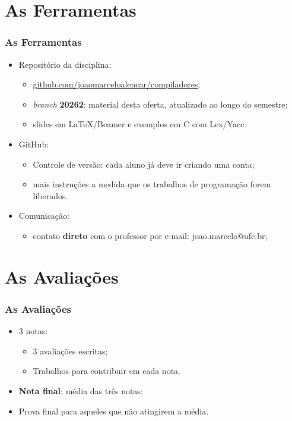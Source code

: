 \documentclass[table]{beamer}
\begin{document}
\section{As Ferramentas}
\begin{frame}
   \frametitle{As Ferramentas}
   \begin{itemize}
      \item Repositório da disciplina:
      \begin{itemize}
         \item \url{github.com/joaomarceloalencar/compiladores};
	 \item \textit{branch} \textbf{20262}: material desta oferta, atualizado ao longo do semestre;
	 \item slides em \LaTeX/Beamer e exemplos em C com Lex/Yacc.
      \end{itemize}
      \item GitHub:
      \begin{itemize}
         \item Controle de versão: cada aluno já deve ir criando uma conta;
	 \item mais instruções a medida que os trabalhos de programação forem liberados.
      \end{itemize}
      \item Comunicação:
      \begin{itemize}
         \item contato \textbf{direto} com o professor por e-mail: joao.marcelo@ufc.br;
      \end{itemize}
   \end{itemize}
\end{frame}

\section{As Avaliações}
\begin{frame}
   \frametitle{As Avaliações}
   \begin{itemize}
      \item 3 notas:
      \begin{itemize}
         \item 3 avaliações escritas;
	      \item Trabalhos para contribuir em cada nota.
      \end{itemize}
      \item \textbf{Nota final}: média das três notas;
      \item Prova final para aqueles que não atingirem a média.
   \end{itemize}
\end{frame}
\end{document}
